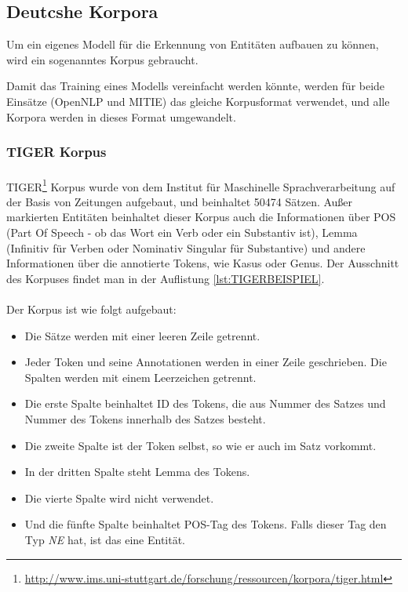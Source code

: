 \subsection{Deutcshe Korpora} \label{subsec:decor}
Um ein eigenes Modell für die Erkennung von Entitäten aufbauen zu können, wird ein sogenanntes Korpus gebraucht. 

Damit das Training eines Modells vereinfacht werden könnte, werden für beide Einsätze (OpenNLP und MITIE) das gleiche Korpusformat verwendet, und alle Korpora werden in dieses Format umgewandelt.

\subsubsection{TIGER Korpus}
\paragraph{}
TIGER\footnote{\url{http://www.ims.uni-stuttgart.de/forschung/ressourcen/korpora/tiger.html}} Korpus wurde von dem Institut für Maschinelle Sprachverarbeitung auf der Basis von Zeitungen aufgebaut, und beinhaltet 50474 Sätzen. Außer markierten Entitäten beinhaltet dieser Korpus auch die Informationen über POS (Part Of Speech - ob das Wort ein Verb oder ein Substantiv ist), Lemma (Infinitiv für Verben oder Nominativ Singular für Substantive) und andere Informationen über die annotierte Tokens, wie Kasus oder Genus. Der Ausschnitt des Korpuses findet man in der Auflistung \ref{lst:TIGERBEISPIEL}.



\paragraph{}
Der Korpus ist wie folgt aufgebaut:
\begin{itemize}
\item Die Sätze werden mit einer leeren Zeile getrennt.
\item Jeder Token und seine Annotationen werden in einer Zeile geschrieben. Die Spalten werden mit einem Leerzeichen getrennt.
\item Die erste Spalte beinhaltet ID des Tokens, die aus Nummer des Satzes und Nummer des Tokens innerhalb des Satzes besteht.
\item Die zweite Spalte ist der Token selbst, so wie er auch im Satz vorkommt.
\item In der dritten Spalte steht Lemma des Tokens.
\item Die vierte Spalte wird nicht verwendet.
\item Und die fünfte Spalte beinhaltet POS-Tag des Tokens. Falls dieser Tag den Typ \textit{NE} hat, ist das eine Entität.
\end{itemize}

